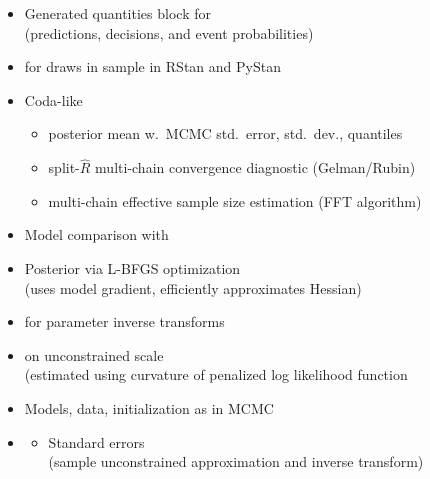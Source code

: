 \documentclass[10pt]{report}
\begin{document}
\begin{itemize}
\item Generated quantities block for 
  \\ {\footnotesize (predictions, decisions, and event probabilities)}
\item {} for draws in sample in RStan and PyStan
\item Coda-like 
  \vspace*{-4pt}
  \begin{itemize}\small
  \item posterior mean w.\ MCMC std.\ error, std.\ dev., quantiles
  \item split-$\hat{R}$ multi-chain convergence diagnostic (Gelman/Rubin)
  \item multi-chain effective sample size estimation (FFT algorithm)
  \end{itemize}
\item Model comparison with 
\end{itemize}


\begin{itemize}
\item Posterior  via L-BFGS optimization
  \\ {\footnotesize (uses model gradient, efficiently approximates Hessian)}
\item {} for parameter inverse transforms
  \item  {} on unconstrained scale
    \\
    {\footnotesize  (estimated using curvature of penalized log likelihood function}
\item Models, data, initialization as in MCMC
  \vfill
\item {}
  \vspace*{-4pt}
  \begin{itemize}\small
  \item Standard errors 
    \\
    {\footnotesize  (sample unconstrained approximation and inverse transform)}
  \end{itemize}      
\end{itemize}
\end{document}
